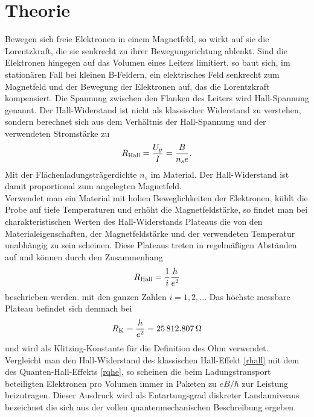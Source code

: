 \documentclass[paper=a4,fontsize=10pt,DIV=18,twocolumn,parskip=half]{scrartcl}
\numberwithin{equation}{section}    %
\begin{document}
%
\section{Theorie}
\label{Theorie}
\label{theorie}
Bewegen sich freie Elektronen in einem Magnetfeld, so wirkt auf sie die Lorentzkraft, die sie senkrecht zu ihrer Bewegungsrichtung ablenkt. Sind die Elektronen hingegen auf das Volumen eines Leiters limitiert, so baut sich, im stationären Fall bei kleinen B-Feldern, ein elektrisches Feld senkrecht zum Magnetfeld und der Bewegung der Elektronen auf, das die Lorentzkraft kompensiert. Die Spannung zwischen den Flanken des Leiters wird Hall-Spannung genannt. Der Hall-Widerstand ist nicht als klassischer Widerstand zu verstehen, sondern berechnet sich aus dem Verhältnis der Hall-Spannung und der verwendeten Stromstärke zu
\begin{equation}
R_{\rm Hall}=\frac{U_y}{I}=\frac{B}{n_s e}.
\label{rhall}
\end{equation}
Mit der Flächenladungsträgerdichte $n_s$ im Material. Der Hall-Widerstand ist damit proportional zum angelegten Magnetfeld. \\
Verwendet man ein Material mit hohen Beweglichkeiten der Elektronen, kühlt die Probe auf tiefe Temperaturen und erhöht die Magnetfeldstärke, so findet man bei charakteristischen Werten des Hall-Widerstands Plateaus die von den Materialeigenschaften, der Magnetfeldstärke und der verwendeten Temperatur unabhängig zu sein scheinen.
Diese Plateaus treten in regelmäßigen Abständen auf und können durch den Zusammenhang 
\begin{equation}
R_{\rm Hall}=\frac{1}{i} \frac{h}{e^2} 
\label{rqhe}
\end{equation}
beschrieben werden. mit den ganzen Zahlen $i=1,2,...$ Das höchste messbare Plateau befindet sich demnach bei 
\begin{equation}
R_{\rm K}=\frac{h}{e^2}= \SI{25812.807}{\ohm}
\end{equation}
und wird als Klitzing-Konstante für die Definition des Ohm verwendet.\\
Vergleicht man den Hall-Widerstand des klassischen Hall-Effekt \ref{rhall} mit dem des Quanten-Hall-Effekts \ref{rqhe}, so scheinen die beim Ladungstransport beteiligten Elektronen pro Volumen immer in Paketen zu $e B/\hbar$ zur Leistung beizutragen. Dieser Ausdruck wird als Entartungsgrad diskreter Landauniveaus bezeichnet die sich aus der vollen quantenmechanischen Beschreibung ergeben.
\end{document}
